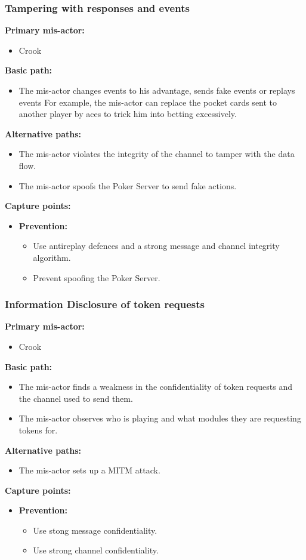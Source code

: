 \documentclass[a4paper,11pt]{report}
\begin{document}
\subsubsection{Tampering with responses and events}
\label{PlayerFlowCasesT4}
\textbf{Primary mis-actor:}
\begin{itemize}
\item Crook
\end{itemize}
\textbf{Basic path:}
\begin{itemize}
\item The mis-actor changes events to his advantage, sends fake events or replays events For example, the mis-actor can replace the pocket cards sent to another player by aces to trick him into betting excessively.
\end{itemize}
\textbf{Alternative paths:}
\begin{itemize}
\item The mis-actor violates the integrity of the channel to tamper with the data flow.
\item The mis-actor spoofs the Poker Server to send fake actions.
\end{itemize}
\textbf{Capture points:}
\begin{itemize}
\item \textbf{Prevention:}
\begin{itemize}
\item Use antireplay defences and a strong message and channel integrity algorithm.
\item Prevent spoofing the Poker Server.
\end{itemize}
\end{itemize}


\subsubsection{Information Disclosure of token requests}
\label{PlayerFlowCasesI1}
\textbf{Primary mis-actor:}
\begin{itemize}
\item Crook
\end{itemize}
\textbf{Basic path:}
\begin{itemize}
\item The mis-actor finds a weakness in the confidentiality of token requests and the channel used to send them.
\item The mis-actor observes who is playing and what modules they are requesting tokens for.
\end{itemize}
\textbf{Alternative paths:}
\begin{itemize}
\item The mis-actor sets up a MITM attack.
\end{itemize}
\textbf{Capture points:}
\begin{itemize}
\item \textbf{Prevention:}
\begin{itemize}
\item Use stong message confidentiality.
\item Use strong channel confidentiality.
\end{itemize}
\end{itemize}
\end{document}
